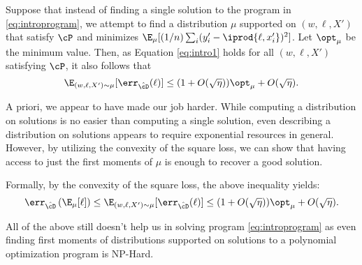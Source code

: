 Suppose that instead of finding a single solution to the program in \eqref{eq:introprogram}, we attempt to find a distribution $\mu$ supported on $(w,\ell,X')$ that satisfy $\cP$ and minimizes $\E_\mu[(1/n) \sum_i (y_i' - \iprod{\ell,x'_i})^2]$. Let $\opt_{\mu}$ be the minimum value. Then, as Equation \ref{eq:intro1} holds for all $(w,\ell,X')$ satisfying $\cP$, it also follows that
\begin{equation}\E_{(w,\ell,X') \sim \mu}[ \err_{\hat{\cD}}(\ell)] \leq (1 + O(\sqrt{\eta})) \opt_\mu + O(\sqrt{\eta}).\label{eq:error-equation-intro}\end{equation}

A priori, we appear to have made our job harder. While computing a distribution on solutions is no easier than computing a single solution, even describing a distribution on solutions appears to require exponential resources in general. However, by utilizing the convexity of the square loss, we can show that having access to just the first moments of $\mu$ is enough to recover a good solution. %

Formally, by the convexity of the square loss, the above inequality yields:
\begin{equation} \label{eq:convexity-intro}\err_{\hat{\cD}}\left(\E_\mu[\ell]\right) \leq \E_{(w,\ell,X') \sim \mu}[ \err_{\hat{\cD}}(\ell)] \leq (1 + O(\sqrt{\eta})) \opt_\mu + O(\sqrt{\eta}).\end{equation}

All of the above still doesn't help us in solving program \ref{eq:introprogram} as even finding first moments of distributions supported on solutions to a polynomial optimization program is NP-Hard. %


